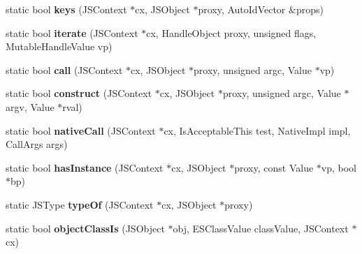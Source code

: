 \begin{DoxyCompactItemize}
\item 
\hypertarget{classjs_1_1_proxy_a455d3da56c738e76c5f44c34ad7ab3bf}{static bool {\bfseries keys} (J\-S\-Context $\ast$cx, J\-S\-Object $\ast$proxy, Auto\-Id\-Vector \&props)}\label{classjs_1_1_proxy_a455d3da56c738e76c5f44c34ad7ab3bf}

\item 
\hypertarget{classjs_1_1_proxy_a7c45b121f4079b7a84b99c6059100459}{static bool {\bfseries iterate} (J\-S\-Context $\ast$cx, Handle\-Object proxy, unsigned flags, Mutable\-Handle\-Value vp)}\label{classjs_1_1_proxy_a7c45b121f4079b7a84b99c6059100459}

\item 
\hypertarget{classjs_1_1_proxy_a00aacb3ef96a6ec72785b2c514c324a4}{static bool {\bfseries call} (J\-S\-Context $\ast$cx, J\-S\-Object $\ast$proxy, unsigned argc, Value $\ast$vp)}\label{classjs_1_1_proxy_a00aacb3ef96a6ec72785b2c514c324a4}

\item 
\hypertarget{classjs_1_1_proxy_ac5ad0fd9151ab2f382b3f86f6f9ec468}{static bool {\bfseries construct} (J\-S\-Context $\ast$cx, J\-S\-Object $\ast$proxy, unsigned argc, Value $\ast$argv, Value $\ast$rval)}\label{classjs_1_1_proxy_ac5ad0fd9151ab2f382b3f86f6f9ec468}

\item 
\hypertarget{classjs_1_1_proxy_acd31ab689818ddffbc1bbd898f50f4b4}{static bool {\bfseries native\-Call} (J\-S\-Context $\ast$cx, Is\-Acceptable\-This test, Native\-Impl impl, Call\-Args args)}\label{classjs_1_1_proxy_acd31ab689818ddffbc1bbd898f50f4b4}

\item 
\hypertarget{classjs_1_1_proxy_a87e3f193e8d023f4f994251fa391ca3e}{static bool {\bfseries has\-Instance} (J\-S\-Context $\ast$cx, J\-S\-Object $\ast$proxy, const Value $\ast$vp, bool $\ast$bp)}\label{classjs_1_1_proxy_a87e3f193e8d023f4f994251fa391ca3e}

\item 
\hypertarget{classjs_1_1_proxy_a3cc8aba5ad1d56904cf35ea080c6da4a}{static J\-S\-Type {\bfseries type\-Of} (J\-S\-Context $\ast$cx, J\-S\-Object $\ast$proxy)}\label{classjs_1_1_proxy_a3cc8aba5ad1d56904cf35ea080c6da4a}

\item 
\hypertarget{classjs_1_1_proxy_af92d9a02c9af149b6ad03a3d3b62d6b1}{static bool {\bfseries object\-Class\-Is} (J\-S\-Object $\ast$obj, E\-S\-Class\-Value class\-Value, J\-S\-Context $\ast$cx)}\label{classjs_1_1_proxy_af92d9a02c9af149b6ad03a3d3b62d6b1}


\end{DoxyCompactItemize}
